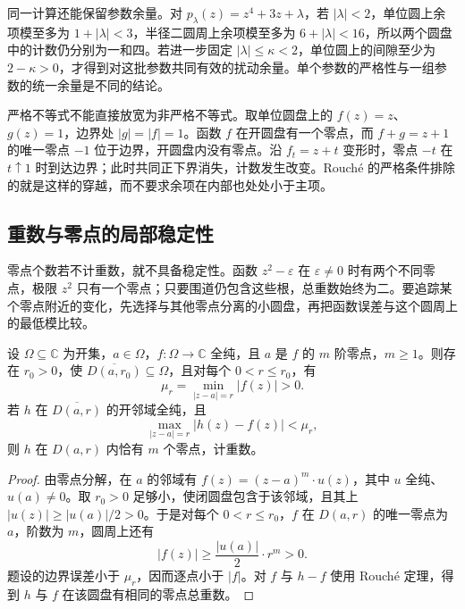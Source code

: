 \ProseParagraphBreak

同一计算还能保留参数余量。对 \(p_\lambda(z)=z^4+3z+\lambda\)，若 \(|\lambda|<2\)，单位圆上余项模至多为 \(1+|\lambda|<3\)，半径二圆周上余项模至多为 \(6+|\lambda|<16\)，所以两个圆盘中的计数仍分别为一和四。若进一步固定 \(|\lambda|\le\kappa<2\)，单位圆上的间隙至少为 \(2-\kappa>0\)，才得到对这批参数共同有效的扰动余量。单个参数的严格性与一组参数的统一余量是不同的结论。

\ProseParagraphBreak

严格不等式不能直接放宽为非严格不等式。取单位圆盘上的 \(f(z)=z\)、\(g(z)=1\)，边界处 \(|g|=|f|=1\)。函数 \(f\) 在开圆盘有一个零点，而 \(f+g=z+1\) 的唯一零点 \(-1\) 位于边界，开圆盘内没有零点。沿 \(f_t=z+t\) 变形时，零点 \(-t\) 在 \(t\uparrow1\) 时到达边界；此时共同正下界消失，计数发生改变。Rouché 的严格条件排除的就是这样的穿越，而不要求余项在内部也处处小于主项。

\subsection{重数与零点的局部稳定性}
\label{b3:subsec:030403}

零点个数若不计重数，就不具备稳定性。函数 \(z^2-\varepsilon\) 在 \(\varepsilon\ne0\) 时有两个不同零点，极限 \(z^2\) 只有一个零点；只要围道仍包含这些根，总重数始终为二。要追踪某个零点附近的变化，先选择与其他零点分离的小圆盘，再把函数误差与这个圆周上的最低模比较。

\begin{proposition}[零点局部稳定]\label{b3:prop:03-local-zero-stability}
设 \(\Omega\subseteq\mathbb C\) 为开集，\(a\in\Omega\)，\(f:\Omega\to\mathbb C\) 全纯，且 \(a\) 是 \(f\) 的 \(m\) 阶零点，\(m\ge1\)。则存在 \(r_0>0\)，使 \(\overline{D(a,r_0)}\subseteq\Omega\)，且对每个 \(0<r\le r_0\)，有
\[
 \mu_r=\min_{|z-a|=r}|f(z)|>0.
\]
若 \(h\) 在 \(\overline{D(a,r)}\) 的开邻域全纯，且
\[
 \max_{|z-a|=r}|h(z)-f(z)|<\mu_r,
\]
则 \(h\) 在 \(D(a,r)\) 内恰有 \(m\) 个零点，计重数。
\end{proposition}
\begin{proof}
由零点分解，在 \(a\) 的邻域有 \(f(z)=(z-a)^m\cdot u(z)\)，其中 \(u\) 全纯、\(u(a)\ne0\)。取 \(r_0>0\) 足够小，使闭圆盘包含于该邻域，且其上 \(|u(z)|\ge |u(a)|/2>0\)。于是对每个 \(0<r\le r_0\)，\(f\) 在 \(D(a,r)\) 的唯一零点为 \(a\)，阶数为 \(m\)，圆周上还有
\[
 |f(z)|\ge\frac{|u(a)|}{2}\cdot r^m>0.
\]
题设的边界误差小于 \(\mu_r\)，因而逐点小于 \(|f|\)。对 \(f\) 与 \(h-f\) 使用 Rouché 定理，得到 \(h\) 与 \(f\) 在该圆盘有相同的零点总重数。
\end{proof}

